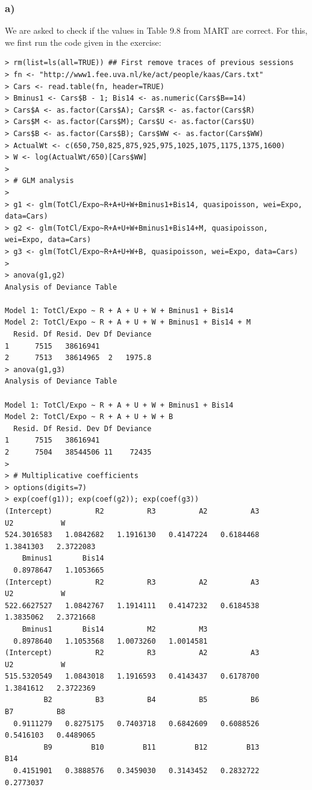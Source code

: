 \documentclass[11pt]{article}
\begin{document}
\subsubsection*{a)}
We are asked to check if the values in Table 9.8 from MART are correct. For this, we first run the code given in the exercise:

\begin{verbatim}
> rm(list=ls(all=TRUE)) ## First remove traces of previous sessions
> fn <- "http://www1.fee.uva.nl/ke/act/people/kaas/Cars.txt"
> Cars <- read.table(fn, header=TRUE)
> Bminus1 <- Cars$B - 1; Bis14 <- as.numeric(Cars$B==14)
> Cars$A <- as.factor(Cars$A); Cars$R <- as.factor(Cars$R)
> Cars$M <- as.factor(Cars$M); Cars$U <- as.factor(Cars$U)
> Cars$B <- as.factor(Cars$B); Cars$WW <- as.factor(Cars$WW)
> ActualWt <- c(650,750,825,875,925,975,1025,1075,1175,1375,1600)
> W <- log(ActualWt/650)[Cars$WW]
> 
> # GLM analysis
> 
> g1 <- glm(TotCl/Expo~R+A+U+W+Bminus1+Bis14, quasipoisson, wei=Expo, data=Cars)
> g2 <- glm(TotCl/Expo~R+A+U+W+Bminus1+Bis14+M, quasipoisson, wei=Expo, data=Cars)
> g3 <- glm(TotCl/Expo~R+A+U+W+B, quasipoisson, wei=Expo, data=Cars)
> 
> anova(g1,g2)
Analysis of Deviance Table

Model 1: TotCl/Expo ~ R + A + U + W + Bminus1 + Bis14
Model 2: TotCl/Expo ~ R + A + U + W + Bminus1 + Bis14 + M
  Resid. Df Resid. Dev Df Deviance
1      7515   38616941            
2      7513   38614965  2   1975.8
> anova(g1,g3)
Analysis of Deviance Table

Model 1: TotCl/Expo ~ R + A + U + W + Bminus1 + Bis14
Model 2: TotCl/Expo ~ R + A + U + W + B
  Resid. Df Resid. Dev Df Deviance
1      7515   38616941            
2      7504   38544506 11    72435
> 
> # Multiplicative coefficients
> options(digits=7)
> exp(coef(g1)); exp(coef(g2)); exp(coef(g3))
(Intercept)          R2          R3          A2          A3          U2           W
524.3016583   1.0842682   1.1916130   0.4147224   0.6184468   1.3841303   2.3722083
    Bminus1       Bis14 
  0.8978647   1.1053665 
(Intercept)          R2          R3          A2          A3          U2           W 
522.6627527   1.0842767   1.1914111   0.4147232   0.6184538   1.3835062   2.3721668 
    Bminus1       Bis14          M2          M3 
  0.8978640   1.1053568   1.0073260   1.0014581   
(Intercept)          R2          R3          A2          A3          U2           W 
515.5320549   1.0843018   1.1916593   0.4143437   0.6178700   1.3841612   2.3722369
         B2          B3          B4          B5          B6          B7          B8 
  0.9111279   0.8275175   0.7403718   0.6842609   0.6088526   0.5416103   0.4489065 
         B9         B10         B11         B12         B13         B14 
  0.4151901   0.3888576   0.3459030   0.3143452   0.2832722   0.2773037 
\end{verbatim}
\end{document}
